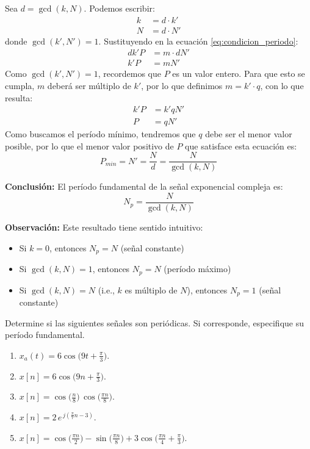 \documentclass[
  11pt,
  letterpaper,
   addpoints,
  ]{exam}
\begin{document}
\begin{questions}
\begin{solution}
Sea \(d = \gcd(k,N)\). Podemos escribir:
\begin{align}
k &= d \cdot k' \\
N &= d \cdot N'
\end{align}
donde \(\gcd(k', N') = 1\). Sustituyendo en la ecuación \eqref{eq:condicion_periodo}:
\begin{align}
d k' P &= m \cdot d N' \\
k' P &= m N'
\end{align}
Como \(\gcd(k', N') = 1\), recordemos que \(P\) es un valor entero. Para que esto se cumpla, \(m\) deberá ser múltiplo de \(k'\), por lo que definimos \(m=k'\cdot q\), con lo que resulta:
\begin{align}
  k' P &= k' q N' \\
  P &= q N'
\end{align}
Como buscamos el período mínimo, tendremos que \(q\) debe ser el menor valor posible, por lo que el menor valor positivo de \(P\) que satisface esta ecuación es:
\begin{equation}
P_{min} = N' = \frac{N}{d} = \frac{N}{\gcd(k,N)}
\end{equation}

\medskip
\textbf{Conclusión:} El período fundamental de la señal exponencial compleja es:
\begin{equation}
\boxed{N_p = \frac{N}{\gcd(k,N)}}
\end{equation}

\textbf{Observación:} Este resultado tiene sentido intuitivo:
\begin{itemize}
\item Si \(k = 0\), entonces \(N_p = N\) (señal constante)
\item Si \(\gcd(k,N) = 1\), entonces \(N_p = N\) (período máximo)
\item Si \(\gcd(k,N) = N\) (i.e., \(k\) es múltiplo de \(N\)), entonces \(N_p = 1\) (señal constante)
\end{itemize}

\end{solution}

    \question Determine si las siguientes señales son periódicas. Si corresponde, especifique su período fundamental.
\begin{enumerate}
  \item \(x_a(t)=6\cos\big(9t+\tfrac{\pi}{3}\big)\).
  \item \(x[n]=6\cos\big(9n+\tfrac{\pi}{3}\big)\).
  \item \(x[n]=\cos\!\big(\tfrac{n}{8}\big)\,\cos\!\big(\tfrac{\pi n}{8}\big)\).
  \item \(x[n]=2\,e^{\,j\left(\tfrac{\pi}{7}n-3\right)}\).
  \item \(x[n]=\cos\!\big(\tfrac{\pi n}{2}\big)-\sin\!\big(\tfrac{\pi n}{8}\big)+3\cos\!\big(\tfrac{\pi n}{4}+\tfrac{\pi}{3}\big)\).
\end{enumerate}


\end{questions}
\end{document}
